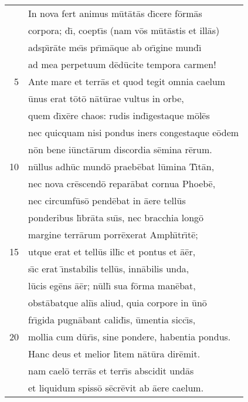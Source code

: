\documentclass[paper=6in:9in,pagesize=pdftex,
               headinclude=on,footinclude=on,12pt]{scrbook}
\begin{document}

\begin{longtable}[p]{ r l }
 & \indent In nova fert animus m\=ut\=at\=as d\={\i}cere f\=orm\=as\\ 
 & corpora; d\={\i}, coept\={\i}s (nam v\=os m\=ut\=astis et ill\=as)\\ 
 & adsp\={\i}r\=ate me\={\i}s pr\={\i}m\=aque ab or\={\i}gine mund\={\i}\\ 
 & ad mea perpetuum d\=ed\=ucite tempora carmen!\\ 
5 & \indent Ante mare et terr\=as et quod tegit omnia caelum\\ 
 & \=unus erat t\=ot\=o n\=at\=urae vultus in orbe,\\ 
 & quem d\={\i}x\=ere chaos: rudis ind\={\i}gestaque m\=ol\=es\\ 
 & nec quicquam nisi pondus iners congestaque e\=odem\\ 
 & n\=on bene i\=unct\=arum discordia s\=emina r\=erum.\\ 
10 & n\=ullus adh\=uc mund\=o praeb\=ebat l\=umina T\={\i}t\=an,\\ 
 & nec nova cr\=escend\=o repar\=abat cornua Phoeb\=e,\\ 
 & nec circumf\=us\=o pend\=ebat in \=aere tell\=us\\ 
 & ponderibus l\={\i}br\=ata su\={\i}s, nec bracchia long\=o\\ 
 & margine terr\=arum porr\=exerat Amph\={\i}tr\={\i}t\=e;\\ 
15 & utque erat et tell\=us ill\={\i}c et pontus et \=a\=er,\\ 
 & s\={\i}c erat \={\i}nstabilis tell\=us, inn\=abilis unda,\\ 
 & l\=ucis eg\=ens \=a\=er; n\=ull\={\i} sua f\=orma man\=ebat,\\ 
 & obst\=abatque ali\={\i}s aliud, quia corpore in \=un\=o\\ 
 & fr\={\i}gida pugn\=abant calid\={\i}s, \=umentia sicc\={\i}s,\\ 
20 & mollia cum d\=ur\={\i}s, sine pondere, habentia pondus.\\ 
 & \indent Hanc deus et melior l\={\i}tem n\=at\=ura dir\=emit.\\ 
 & nam cael\=o terr\=as et terr\={\i}s abscidit und\=as\\ 
 & et liquidum spiss\=o s\=ecr\=evit ab \=aere caelum.\\ 

\end{longtable}
\end{document}

